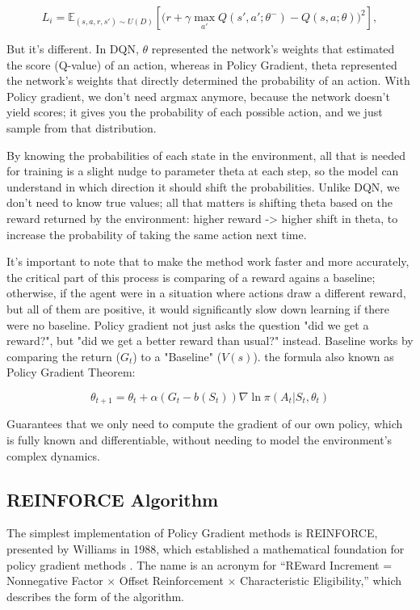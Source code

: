 \[
L_i = \mathbb{E}_{(s,a,r,s')\sim U(D)}\left[ \big(r + \gamma \max_{a'} Q(s',a';\theta^{-})- Q(s,a;\theta) \big)^2\right],
\]


But it's different. In DQN, $\theta$ represented the network's weights that estimated the score (Q-value) of an action, whereas in Policy Gradient, theta represented the network's weights that directly determined the probability of an action. With Policy gradient, we don't need argmax anymore, because the network doesn't yield scores; it gives you the probability of each possible action, and we just sample from that distribution. 


By knowing the probabilities of each state in the environment, all that is needed for training is a slight nudge to parameter theta at each step, so the model can understand in which direction it should shift the probabilities. Unlike DQN, we don't need to know true values; all that matters is shifting theta based on the reward returned by the environment: higher reward -> higher shift in theta, to increase the probability of taking the same action next time.


It's important to note that to make the method work faster and more accurately, the critical part of this process is comparing of a reward agains a baseline; otherwise, if the agent were in a situation where actions draw a different reward, but all of them are positive, it would significantly slow down learning if there were no baseline. Policy gradient not just asks the question "did we get a reward?", but "did we get a better reward than usual?" instead. Baseline works by comparing the return ($G_t$) to a "Baseline" ($V(s)$). the formula also known as Policy Gradient Theorem:

\[
\theta_{t+1} = \theta_t + \alpha (G_t - b(S_t)) \nabla \ln \pi(A_t | S_t, \theta_t)
\]

Guarantees that we only need to compute the gradient of our own policy, which is fully known and differentiable, without needing to model the environment's complex dynamics.



\subsection{REINFORCE Algorithm}


The simplest implementation of Policy Gradient methods is REINFORCE, presented by Williams in 1988, which established a mathematical foundation for policy gradient methods \cite{Williams1988}. The name is an acronym for ``REward Increment = Nonnegative Factor $\times$ Offset Reinforcement $\times$ Characteristic Eligibility,'' which describes the form of the algorithm.


